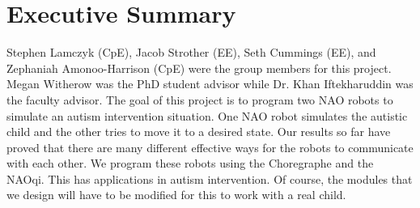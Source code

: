 \chapter{Executive Summary}
\label{apdx:Summary}
Stephen Lamczyk (CpE), Jacob Strother (EE), Seth Cummings (EE), and Zephaniah Amonoo-Harrison (CpE) were the group members for this project. Megan Witherow was the PhD student advisor while Dr. Khan Iftekharuddin was the faculty advisor. The goal of this project is to program two NAO robots to simulate an autism intervention situation. One NAO robot simulates the autistic child and the other tries to move it to a desired state. Our results so far have proved that there are many different effective ways for the robots to communicate with each other. We program these robots using the Choregraphe and the NAOqi. This has applications in autism intervention. Of course, the modules that we design will have to be modified for this to work with a real child.  \par

